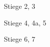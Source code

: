 \documentclass[a4paper]{article}
\begin{document}
\printGenericVSLHeader
\begin{center}
\begin{vsltext}{3cm}{3.5cm}

    \Stair{2cm} Stiege 2, 3

    \vspace{1cm}

    \Stair{2cm} Stiege 4, 4a, 5

    \vspace{1cm}

    \Stair{2cm} Stiege 6, 7

\end{vsltext}
\end{center}
\end{document}
